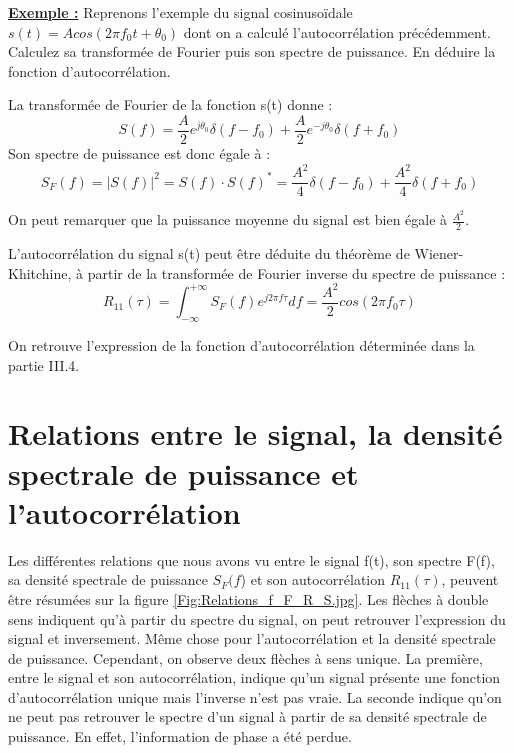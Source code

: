 	
	\textbf{\underline{Exemple :}} 
	Reprenons l'exemple du signal cosinusoïdale $s(t)=Acos(2\pi f_{0}t+\theta_{0})$ dont on a calculé l'autocorrélation précédemment. Calculez sa transformée de Fourier puis son spectre de puissance. En déduire la fonction d'autocorrélation.
	
	La transformée de Fourier de la fonction s(t) donne :
	\begin{equation*}
	S(f) = \frac{A}{2}e^{j\theta_{0}}\delta(f-f_{0})+\frac{A}{2}e^{-j\theta_{0}}\delta(f+f_{0})
	\end{equation*}
	Son spectre de puissance est donc égale à :
	\begin{equation*}
	S_{F}(f)=|S(f)|^{2}=S(f) \cdot S(f)^{*}=\frac{A^{2}}{4}\delta(f-f_{0})+\frac{A^{2}}{4}\delta(f+f_{0})
	\end{equation*}
	
	On peut remarquer que la puissance moyenne du signal est bien égale à $\frac{A^{2}}{2}$.
	
	L'autocorrélation du signal s(t) peut être déduite du théorème de Wiener-Khitchine, à partir de la transformée de Fourier inverse du spectre de puissance :
	\begin{equation*}
	R_{11}(\tau)=\int_{-\infty}^{+\infty}S_{F}(f)e^{j2\pi f\tau}df=\frac{A^{2}}{2}cos(2\pi f_{0}\tau)
	\end{equation*}
	
	On retrouve l'expression de la fonction d'autocorrélation déterminée dans la partie III.4. 
	
	\vspace{1\baselineskip}
	
	
	\section{Relations entre le signal, la densité spectrale de puissance et l'autocorrélation}
	
	Les différentes relations que nous avons vu entre le signal f(t), son spectre F(f), sa densité spectrale de puissance $S_{F}(f$) et son autocorrélation $R_{11}(\tau)$, peuvent être résumées sur la figure \ref{Fig:Relations_f_F_R_S.jpg}. Les flèches à double sens indiquent qu'à partir du spectre du signal, on peut retrouver l'expression du signal et inversement. Même chose pour l'autocorrélation et la densité spectrale de puissance. Cependant, on observe deux flèches à sens unique. La première, entre le signal et son autocorrélation, indique qu'un signal présente une fonction d'autocorrélation unique mais l'inverse n'est pas vraie. La seconde indique qu'on ne peut pas retrouver le spectre d'un signal à partir de sa densité spectrale de puissance. En effet, l'information de phase a été perdue.
	
